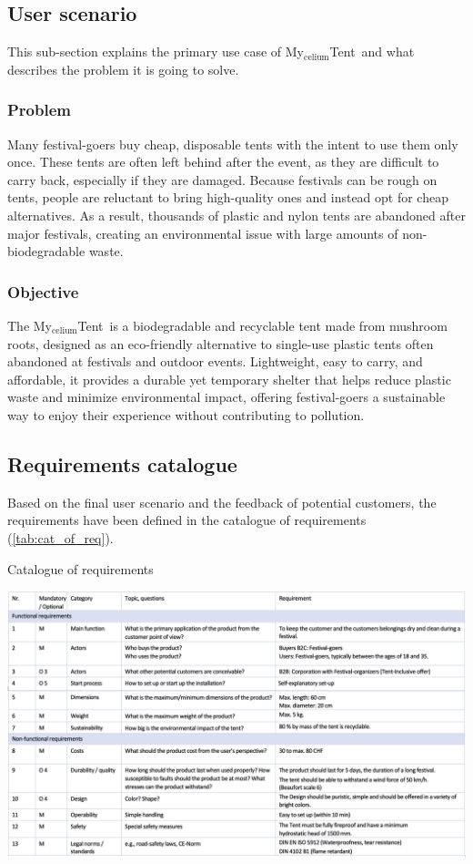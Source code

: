 \documentclass{article}
\newcommand{\myc}{My$_{\text{celium}}$Tent}
\begin{document}
\subsection{User scenario}
This sub-section explains the primary use case of \myc\ and what describes the
problem it is going to solve. 

\subsubsection{Problem}
Many festival-goers buy cheap, disposable tents with the intent to use them only once.
These tents are often left behind after the event, as they are difficult to carry back,
especially if they are damaged. Because festivals can be rough on tents, people are
reluctant to bring high-quality ones and instead opt for cheap alternatives. As a result,
thousands of plastic and nylon tents are abandoned after major festivals, creating an
environmental issue with large amounts of non-biodegradable waste.

\subsubsection{Objective}
The \myc\ is a biodegradable and recyclable tent made from mushroom roots, designed
as an eco-friendly alternative to single-use plastic tents often abandoned at festivals
and outdoor events. Lightweight, easy to carry, and affordable, it provides a durable yet
temporary shelter that helps reduce plastic waste and minimize environmental impact,
offering festival-goers a sustainable way to enjoy their experience without contributing
to pollution.

\subsection{Requirements catalogue}
Based on the final user scenario and the feedback of potential customers, the requirements
have been defined in the catalogue of requirements (\autoref{tab:cat_of_req}).

\begin{table}[ht!]
    \centering
    \caption{Catalogue of requirements}
    \includegraphics[width=\textwidth]{media/req_cat_high_res.png}
    \label{tab:cat_of_req}
\end{table}
\end{document}
